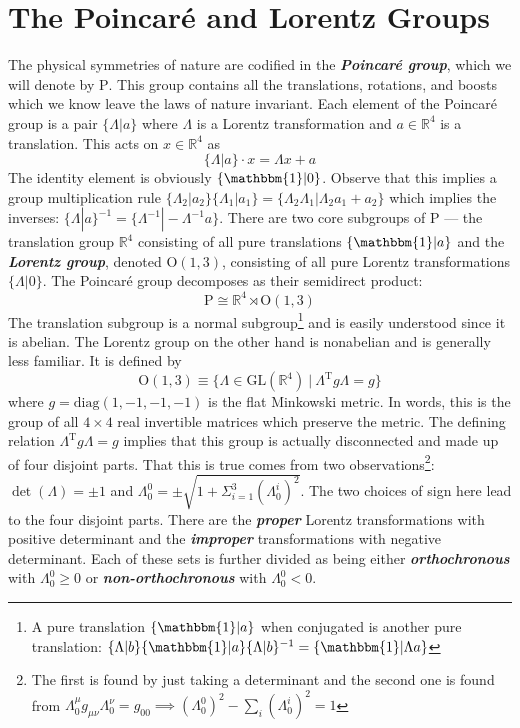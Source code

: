 \documentclass[onecolumn]{gwclass}
\renewcommand{\t}[1]{\text{#1}}
\begin{document}
\newpage

\section{The Poincar\'e and Lorentz Groups}
The physical symmetries of nature are codified in the \textbf{\emph{Poincar\'e group}}, which we will denote by $\t{P}$. This group contains all the translations, rotations, and boosts which we know leave the laws of nature invariant. Each element of the Poincar\'e group is a pair $\{\Lambda|a\}$ where $\Lambda$ is a Lorentz transformation and $a\in\mathbb{R}^4$ is a translation. This acts on $x\in\mathbb{R}^4$ as
$$ \{\Lambda|a\}\cdot x =\Lambda x + a $$
The identity element is obviously $\{\mathbbm{1}|0\}$. Observe that this implies a group multiplication rule $\{\Lambda_2|a_2\}\{\Lambda_1|a_1 \} = \{\Lambda_2\Lambda_1| \Lambda_2a_1 +  a_2\}$ which implies the inverses: $\{\Lambda|a\}^{-1}=\{\Lambda^{-1}|-\Lambda^{-1}a\}$. There are two core subgroups of P --- the translation group $\mathbb{R}^4$ consisting of all pure translations $\{\mathbbm{1}|a\}$ and the \textbf{\emph{Lorentz group}}, denoted $\t{O}(1,3)$, consisting of all pure Lorentz transformations $\{\Lambda|0\}$. The Poincar\'e group decomposes as their semidirect product:
$$ \t{P}\cong \mathbb{R}^4 \rtimes \t{O}(1,3) $$
The translation subgroup is a normal subgroup\footnote{A pure translation $\{\mathbbm{1}|a\}$ when conjugated is another pure translation: $\{\Lambda|b\}\{\mathbbm{1}|a\}\{\Lambda|b\}^{-1}= \{\mathbbm{1}|\Lambda a\}$} and is easily understood since it is abelian. The Lorentz group on the other hand is nonabelian and is generally less familiar. It is defined by	
$$ \t{O}(1,3) \equiv \{ \Lambda \in \t{GL}(\mathbb{R}^4) \:|\: \Lambda^\t{T} g\Lambda = g \} $$
where $g=\t{diag}(1,-1,-1,-1)$ is the flat Minkowski metric. In words, this is the group of all $4\times 4$ real invertible matrices which preserve the metric. The defining relation $\Lambda^\t{T}g\Lambda=g$ implies that this group is actually disconnected and made up of four disjoint parts. That this is true comes from two observations\footnote{The first is found by just taking a determinant and the second one is found from $\Lambda_0^\mu g_{\mu\nu}\Lambda_0^\nu=g_{00} \implies (\Lambda_0^0)^2 - \sum_i (\Lambda_0^i)^2 = 1$}: $\det(\Lambda)=\pm 1$ and $\Lambda_0^0 = \pm\sqrt{1 + \Sigma_{i=1}^3(\Lambda_0^i)^2}$. The two choices of sign here lead to the four disjoint parts. There are the \textbf{\emph{proper}} Lorentz transformations with positive determinant and the \textbf{\emph{improper}} transformations with negative determinant. Each of these sets is further divided as being either \textbf{\emph{orthochronous}} with $\Lambda_0^0 \geq 0$ or \textbf{\emph{non-orthochronous}} with $\Lambda_0^0 < 0$.
\end{document}
